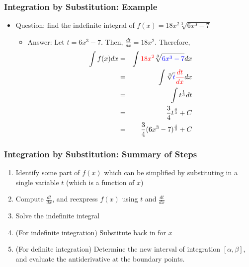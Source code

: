 \documentclass[pdflatex, 12pt]{beamer}
\begin{document}
\begin{frame}
\frametitle{Integration by Substitution: Example}
\begin{itemize}
\item Question: find the indefinite integral of $f(x) = 18x^2 \sqrt[3]{6x^3 - 7}$
\vspace{0.4cm}
 \begin{itemize}
 \item Answer: Let $t = 6x^3 - 7$. Then, $\frac{dt}{dx} = 18x^2$. Therefore,
  \begin{eqnarray}
  \int f(x) dx &=& \int {\color{red}18x^2} \sqrt[3]{\color{blue} 6x^3 - 7} dx \notag \\
  &=& \int \sqrt[3]{\color{blue} t} {\color{red} \frac{dt}{dx}} dx \notag \\
  &=& \int t^{\frac{1}{3}} dt \notag \\
  &=& \frac{3}{4} t^{\frac{4}{3}} + C \notag \\
  &=& \frac{3}{4} (6x^3 - 7)^{\frac{4}{3}} + C \notag
  \end{eqnarray}
 \end{itemize}
\end{itemize}
\end{frame}

\begin{frame}
\frametitle{Integration by Substitution: Summary of Steps}
\begin{enumerate}
\item Identify some part of $f(x)$ which can be simplified by substituting in a single variable $t$ (which is a function of $x$)
\item Compute $\frac{dt}{dx}$, and reexpress $f(x)$ using $t$ and $\frac{dt}{dx}$
\item Solve the indefinite integral
\item (For indefinite integration) Substitute back in for $x$
\item (For definite integration) Determine the new interval of integration $[\alpha, \beta]$, and evaluate the antiderivative at the boundary points.
\end{enumerate}
\end{frame}
\end{document}
